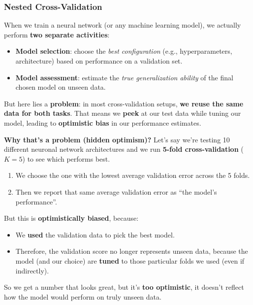 \subsubsection{Nested Cross-Validation}\label{sec:nested-cross-validation}

When we train a neural network (or any machine learning model), we actually perform \textbf{two separate activities}:
\begin{itemize}
    \item \textbf{Model selection}: choose the \emph{best configuration} (e.g., hyperparameters, architecture) based on performance on a validation set.
    \item \textbf{Model assessment}: estimate the \emph{true generalization ability} of the final chosen model on unseen data.
\end{itemize}
\textcolor{Red2}{} But here lies a \textbf{problem}: in most cross-validation setups, \textbf{we reuse the same data for both tasks}. That means we \textbf{peek} at our test data while tuning our model, leading to \textbf{optimistic bias} in our performance estimates.

\highspace
\textcolor{Red2}{ \textbf{Why that's a problem (hidden optimism)?}} Let's say we're testing 10 different neuronal network architectures and we run \textbf{5-fold cross-validation} ($K=5$) to see which performs best.
\begin{enumerate}
    \item We choose the one with the lowest average validation error across the 5 folds.
    \item Then we report that same average validation error as ``the model's performance''.
\end{enumerate}
\textcolor{Red2}{} But this is \textbf{optimistically biased}, because:
\begin{itemize}
    \item We \textbf{used} the validation data to pick the best model.
    \item Therefore, the validation score no longer represents unseen data, because the model (and our choice) are \textbf{tuned} to those particular folds we used (even if indirectly).
\end{itemize}
So we get a number that looks great, but it's \textbf{too optimistic}, it doesn't reflect how the model would perform on truly unseen data.

